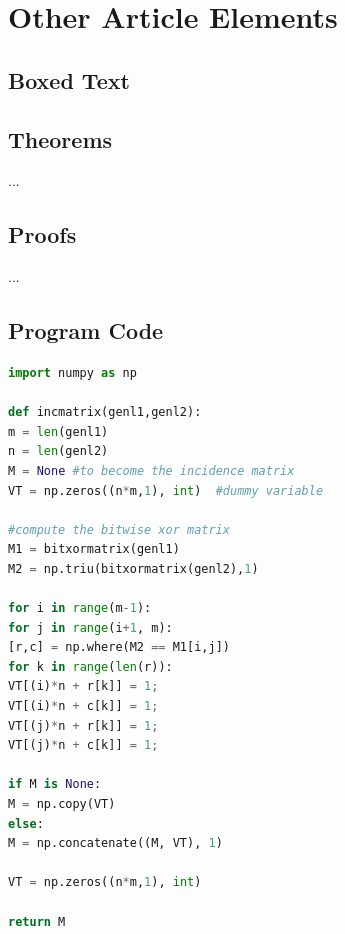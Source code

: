 \documentclass{csmagazine}
\begin{document}
\section{Other Article Elements}

\subsection{Boxed Text}


\subsection{Theorems}

...

\subsection{Proofs}

...


\subsection{Program Code}

\lstset{numbers=left, numberstyle=\small, stepnumber=1, numbersep=1em}
\begin{lstlisting}[language=Python]
import numpy as np

def incmatrix(genl1,genl2):
m = len(genl1)
n = len(genl2)
M = None #to become the incidence matrix
VT = np.zeros((n*m,1), int)  #dummy variable

#compute the bitwise xor matrix
M1 = bitxormatrix(genl1)
M2 = np.triu(bitxormatrix(genl2),1) 

for i in range(m-1):
for j in range(i+1, m):
[r,c] = np.where(M2 == M1[i,j])
for k in range(len(r)):
VT[(i)*n + r[k]] = 1;
VT[(i)*n + c[k]] = 1;
VT[(j)*n + r[k]] = 1;
VT[(j)*n + c[k]] = 1;

if M is None:
M = np.copy(VT)
else:
M = np.concatenate((M, VT), 1)

VT = np.zeros((n*m,1), int)

return M
\end{lstlisting}
\end{document}
